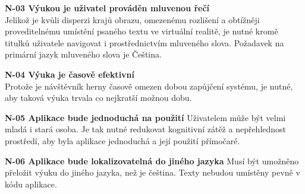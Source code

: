 \textbf{N-03 Výukou je uživatel prováděn mluvenou řečí}\\
Jelikož je kvůli disperzi krajů obrazu, omezenému rozlišení a obtížněji
proveditelnému umístění psaného textu ve virtuální realitě, je nutné
kromě titulků uživatele navigovat i prostřednictvím mluveného slova.
Požadavek na primární jazyk mluveného slova je Čeština.

\textbf{N-04 Výuka je časově efektivní}\\
Protože je návštěvník herny časově omezen dobou zapůjčení systému, je
nutné, aby taková výuka trvala co nejkratší možnou dobu.

\textbf{N-05 Aplikace bude jednoduchá na použití} Uživatelem může být
velmi mladá i stará osoba. Je tak nutné redukovat kognitivní zátěž a
nepřehlednost prostředí, aby byla aplikace jednoduchá a její použití
přímočaré.

\textbf{N-06 Aplikace bude lokalizovatelná do jiného jazyka} Musí být
umožněno přeložit výuku do jiného jazyka, než je čeština. Texty nebudou
umístěny pevně v kódu aplikace.
